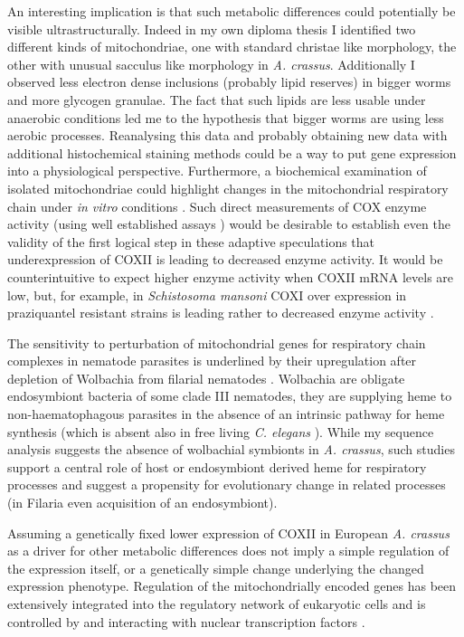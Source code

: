 An interesting implication is that such metabolic differences could
potentially be visible ultrastructurally. Indeed in my own diploma
thesis \cite{heitlinger_vergleichende_2008} I identified two different
kinds of mitochondriae, one with standard christae like morphology,
the other with unusual sacculus like morphology in
\textit{A. crassus}. Additionally I observed less electron dense
inclusions (probably lipid reserves) in bigger worms and more glycogen
granulae. The fact that such lipids are less usable under anaerobic
conditions led me to the hypothesis that bigger worms are using less
aerobic processes. Reanalysing this data and probably obtaining new
data with additional histochemical staining methods could be a way to
put gene expression into a physiological perspective. Furthermore, a
biochemical examination of isolated mitochondriae could highlight
changes in the mitochondrial respiratory chain under \textit{in vitro}
conditions \cite{pmid18314717}. Such direct measurements of COX enzyme
activity (using well established assays \cite{pmid8592440}) would be
desirable to establish even the validity of the first logical step in
these adaptive speculations that underexpression of COXII is leading
to decreased enzyme activity. It would be counterintuitive to expect
higher enzyme activity when COXII mRNA levels are low, but, for
example, in \textit{Schistosoma mansoni} COXI over expression in
praziquantel resistant strains is leading rather to decreased enzyme
activity \cite{pmid9695101}.

The sensitivity to perturbation of mitochondrial genes for respiratory
chain complexes in nematode parasites is underlined by their
upregulation after depletion of Wolbachia from filarial nematodes
\cite{pmid20362581, pmid19806204}. Wolbachia are obligate endosymbiont
bacteria of some clade III nematodes, they are supplying heme to
non-haematophagous parasites in the absence of an intrinsic pathway
for heme synthesis \cite{ghedin_draft_2007} (which is absent also in
free living \textit{C. elegans} \cite{pmid15767563}). While my
sequence analysis suggests the absence of wolbachial symbionts in
\textit{A. crassus}, such studies support a central role of host or
endosymbiont derived heme for respiratory processes and suggest a
propensity for evolutionary change in related processes (in Filaria
even acquisition of an endosymbiont).

Assuming a genetically fixed lower expression of COXII in European
\textit{A. crassus} as a driver for other metabolic differences does
not imply a simple regulation of the expression itself, or a
genetically simple change underlying the changed expression
phenotype. Regulation of the mitochondrially encoded genes has been
extensively integrated into the regulatory network of eukaryotic
cells and is controlled by and interacting with nuclear transcription
factors \cite{pmid8289797}.


